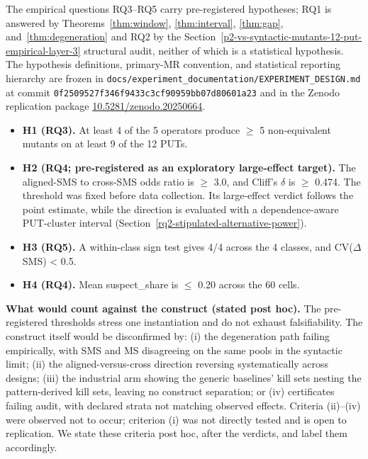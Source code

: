 \documentclass[review,12pt,authoryear]{elsarticle}
\providecommand{\tightlist}{\setlength{\itemsep}{0pt}\setlength{\parskip}{0pt}}
\begin{document}
The empirical questions RQ3--RQ5 carry pre-registered hypotheses; RQ1 is
answered by Theorems~\ref{thm:window}, \ref{thm:interval},
\ref{thm:gap}, and~\ref{thm:degeneration} and RQ2 by the Section~\ref{p2-vs-syntactic-mutants-12-put-empirical-layer-3} structural audit, neither of
which is a statistical hypothesis.
The hypothesis definitions, primary-MR convention, and statistical
reporting hierarchy are frozen in
\texttt{docs/experiment\_documentation/EXPERIMENT\_DESIGN.md} at commit
\texttt{0f2509527f346f9433c3cf90959bb07d80601a23} and in the Zenodo
replication package
\href{https://doi.org/10.5281/zenodo.20250664}{10.5281/zenodo.20250664}.

\begin{itemize}
\tightlist
\item
  \textbf{H1 (RQ3).} At least 4 of the 5 operators produce $\geq$ 5 non-equivalent
  mutants on at least 9 of the 12 PUTs.
\item
  \textbf{H2 (RQ4; pre-registered as an exploratory large-effect
  target).} The aligned-SMS to
  cross-SMS odds ratio is $\geq$ 3.0, and Cliff's $\delta$ is $\geq$ 0.474.
  The threshold was fixed before data collection. Its large-effect
  verdict follows the point estimate, while the direction is evaluated
  with a dependence-aware PUT-cluster interval
  (Section~\ref{rq2-stipulated-alternative-power}).
\item
  \textbf{H3 (RQ5).} A within-class sign test gives 4/4 across the 4 classes,
  and CV($\Delta$SMS) \textless{} 0.5.
\item
  \textbf{H4 (RQ4).} Mean suspect\_share is $\leq$ 0.20 across the 60 cells.
\end{itemize}

\textbf{What would count against the construct (stated post hoc).} The
pre-registered thresholds stress one instantiation and do not exhaust
falsifiability. The construct itself would be disconfirmed by: (i) the
degeneration path failing empirically, with SMS and MS disagreeing on
the same pools in the syntactic limit; (ii) the aligned-versus-cross
direction reversing systematically across designs; (iii) the industrial
arm showing the generic baselines' kill sets nesting the pattern-derived
kill sets, leaving no construct separation; or (iv) certificates failing
audit, with declared strata not matching observed effects. Criteria
(ii)--(iv) were observed not to occur; criterion (i) was not directly
tested and is open to replication. We state these criteria post hoc,
after the verdicts, and label them accordingly.
\end{document}
